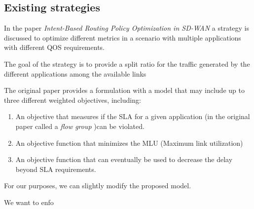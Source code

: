 \documentclass{article}
\begin{document}
\pagebreak

\subsection{Existing strategies}

In the paper \textit{Intent-Based Routing Policy Optimization in SD-WAN} a strategy is discussed to optimize different metrics in a scenario with multiple applications with different QOS requirements.

The goal of the strategy is to provide a split ratio for the traffic generated by the different applications among the available links

The original paper provides a formulation with a model that may include up to three different weighted objectives, including:

\begin{enumerate}
	\item An objective that measures if the SLA for a given application (in the original paper called a \textit{flow group} )can be violated.
	\item An objective function that minimizes the MLU (Maximum link utilization)
	\item An objective function that can eventually be used to decrease the delay beyond SLA requirements.
\end{enumerate}

For our purposes, we can slightly modify the proposed model.

We want to enfo
\end{document}

